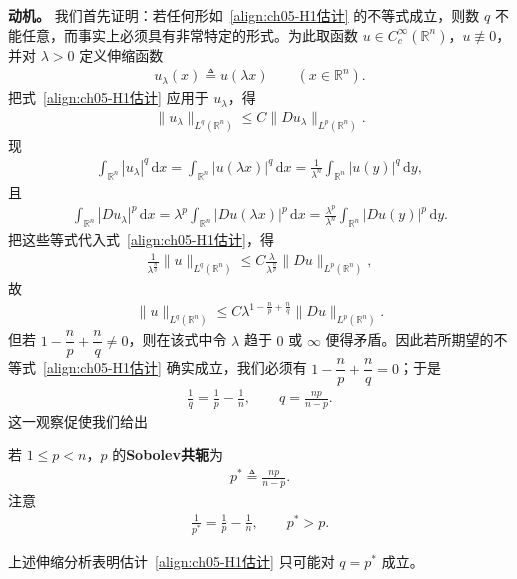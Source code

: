 \documentclass[../../main.tex]{subfiles}
\begin{document}
\textbf{动机。} 我们首先证明：若任何形如~\eqref{align:ch05-H1估计} 的不等式成立，则数 $q$ 不能任意，而事实上必须具有非常特定的形式。为此取函数 $u\in C^{\infty}_{c}(\mathbb{R}^{n})$，$u\not\equiv 0$，并对 $\lambda>0$ 定义伸缩函数
\begin{align*}
u_{\lambda}(x)\triangleq u(\lambda x)\qquad (x\in\mathbb{R}^{n}).
\end{align*}
把式~\eqref{align:ch05-H1估计} 应用于 $u_{\lambda}$，得
\begin{align}
\|u_{\lambda}\|_{L^{q}(\mathbb{R}^{n})}\leqslant C\|Du_{\lambda}\|_{L^{p}(\mathbb{R}^{n})}.
\end{align}
现
\begin{align*}
\int_{\mathbb{R}^{n}}|u_{\lambda}|^{q}\,\mathrm{d}x
=\int_{\mathbb{R}^{n}}|u(\lambda x)|^{q}\,\mathrm{d}x
=\frac{1}{\lambda^{n}}\int_{\mathbb{R}^{n}}|u(y)|^{q}\,\mathrm{d}y,
\end{align*}
且
\begin{align*}
\int_{\mathbb{R}^{n}}|Du_{\lambda}|^{p}\,\mathrm{d}x
=\lambda^{p}\int_{\mathbb{R}^{n}}|Du(\lambda x)|^{p}\,\mathrm{d}x
=\frac{\lambda^{p}}{\lambda^{n}}\int_{\mathbb{R}^{n}}|Du(y)|^{p}\,\mathrm{d}y.
\end{align*}
把这些等式代入式~\eqref{align:ch05-H1估计}，得
\begin{align*}
\frac{1}{\lambda^{\frac{n}{q}}}\|u\|_{L^{q}(\mathbb{R}^{n})}
\leqslant C\frac{\lambda}{\lambda^{\frac{n}{p}}}\|Du\|_{L^{p}(\mathbb{R}^{n})},
\end{align*}
故
\begin{align}
\|u\|_{L^{q}(\mathbb{R}^{n})}\leqslant C\lambda^{1-\frac{n}{p}+\frac{n}{q}}\|Du\|_{L^{p}(\mathbb{R}^{n})}.
\end{align}
但若 $1-\dfrac{n}{p}+\dfrac{n}{q}\neq 0$，则在该式中令 $\lambda$ 趋于 $0$ 或 $\infty$ 便得矛盾。因此若所期望的不等式~\eqref{align:ch05-H1估计} 确实成立，我们必须有 $1-\dfrac{n}{p}+\dfrac{n}{q}=0$；于是
\begin{align*}
\frac{1}{q}=\frac{1}{p}-\frac{1}{n},\qquad q=\frac{np}{n-p}.
\end{align*}
这一观察促使我们给出

\begin{definition}\label{definition:ch05-Sobolev共轭}
若 $1\leqslant p<n$，$p$ 的\textbf{Sobolev共轭}为
\begin{align}
p^{*}\triangleq\frac{np}{n-p}.
\end{align}
注意
\begin{align}
\frac{1}{p^{*}}=\frac{1}{p}-\frac{1}{n},\qquad p^{*}>p.
\end{align}
\end{definition}
\begin{remark}
上述伸缩分析表明估计~\eqref{align:ch05-H1估计} 只可能对 $q=p^{*}$ 成立。
\end{remark}
\end{document}
